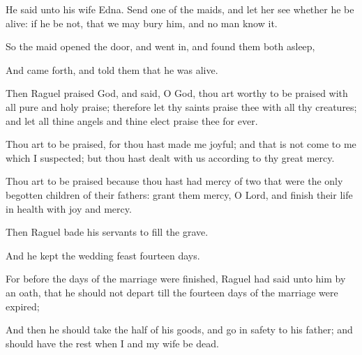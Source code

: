 {\par }{\PP {}He said unto his wife Edna. Send one of the maids, and let her see whether he be alive: if he be not, that we may bury him, and no man know it.
\par }{\PP {}So the maid opened the door, and went in, and found them both asleep,
\par }{\PP {}And came forth, and told them that he was alive.
\par }{\PP {}Then Raguel praised God, and said, O God, thou art worthy to be praised with all pure and holy praise; therefore let thy saints praise thee with all thy creatures; and let all thine angels and thine elect praise thee for ever.
\par }{\PP {}Thou art to be praised, for thou hast made me joyful; and that is not come to me which I suspected; but thou hast dealt with us according to thy great mercy.
\par }{\PP {}Thou art to be praised because thou hast had mercy of two that were the only begotten children of their fathers: grant them mercy, O Lord, and finish their life in health with joy and mercy.
\par }{\PP {}Then Raguel bade his servants to fill the grave.
\par }{\PP {}And he kept the wedding feast fourteen days.
\par }{\PP {}For before the days of the marriage were finished, Raguel had said unto him by an oath, that he should not depart till the fourteen days of the marriage were expired;
\par }{\PP {}And then he should take the half of his goods, and go in safety to his father; and should have the rest when I and my wife be dead.

\par }

